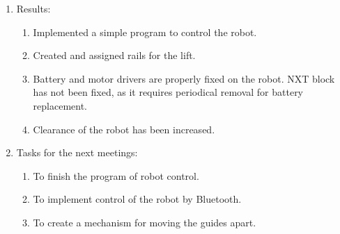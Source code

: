 \begin{enumerate}
	\item Results:  
	\begin{enumerate}
		\item Implemented a simple program to control the robot.
		
		\item  Created and assigned rails for the lift.
		
		\item  Battery and motor drivers are properly fixed on the robot. NXT block has not been fixed, as it requires periodical removal for battery replacement.
		
		\item Clearance of the robot has been increased.
		
	\end{enumerate}
	
	\item Tasks for the next meetings:
	\begin{enumerate}
		\item To finish the program of robot control.
		
		\item To implement control of the robot by Bluetooth.
		
		\item To create a mechanism for moving the guides apart.
		
	\end{enumerate}     
\end{enumerate}
\fillpage
